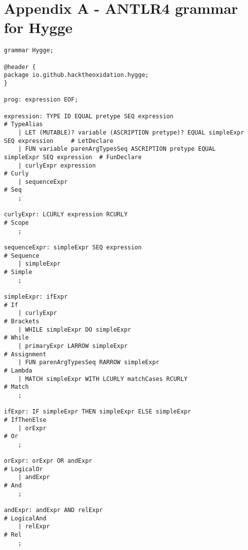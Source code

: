 \chapter{Appendix A - ANTLR4 grammar for Hygge} \label{appendix:hygge_grammar}

\begin{lstlisting}
grammar Hygge;

@header {
package io.github.hacktheoxidation.hygge;
}

prog: expression EOF;

expression: TYPE ID EQUAL pretype SEQ expression                                        # TypeAlias
    | LET (MUTABLE)? variable (ASCRIPTION pretype)? EQUAL simpleExpr SEQ expression     # LetDeclare
    | FUN variable parenArgTypesSeq ASCRIPTION pretype EQUAL simpleExpr SEQ expression  # FunDeclare
    | curlyExpr expression                                                              # Curly
    | sequenceExpr                                                                      # Seq
    ;

curlyExpr: LCURLY expression RCURLY                                       # Scope
    ;

sequenceExpr: simpleExpr SEQ expression                                   # Sequence
    | simpleExpr                                                          # Simple
    ;

simpleExpr: ifExpr                                                        # If
    | curlyExpr                                                           # Brackets
    | WHILE simpleExpr DO simpleExpr                                      # While
    | primaryExpr LARROW simpleExpr                                       # Assignment
    | FUN parenArgTypesSeq RARROW simpleExpr                              # Lambda
    | MATCH simpleExpr WITH LCURLY matchCases RCURLY                      # Match
    ;

ifExpr: IF simpleExpr THEN simpleExpr ELSE simpleExpr                     # IfThenElse
    | orExpr                                                              # Or
    ;

orExpr: orExpr OR andExpr                                                 # LogicalOr
    | andExpr                                                             # And
    ;

andExpr: andExpr AND relExpr                                              # LogicalAnd
    | relExpr                                                             # Rel
    ;


\end{lstlisting}
